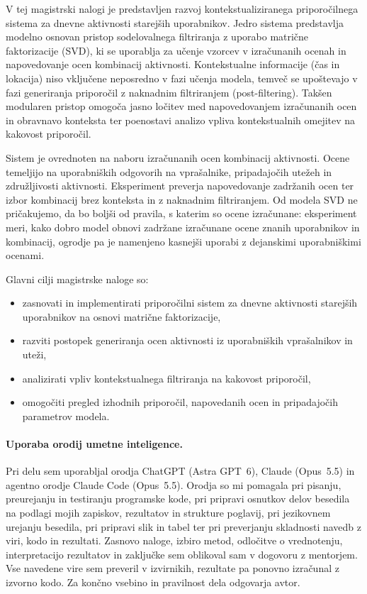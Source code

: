 \documentclass[a4paper,twoside,openright,12pt,slovene]{book}
\begin{document}
V tej magistrski nalogi je predstavljen razvoj kontekstualiziranega
priporočilnega sistema za dnevne aktivnosti starejših uporabnikov. Jedro
sistema predstavlja modelno osnovan pristop sodelovalnega filtriranja z
uporabo matrične faktorizacije (SVD), ki se uporablja za učenje vzorcev v izračunanih ocenah in napovedovanje ocen kombinacij aktivnosti. Kontekstualne informacije
(čas in lokacija) niso vključene neposredno v fazi učenja modela, temveč se
upoštevajo v fazi generiranja priporočil z naknadnim filtriranjem
(post-filtering). Takšen modularen pristop omogoča jasno ločitev med
napovedovanjem izračunanih ocen in obravnavo konteksta ter poenostavi analizo vpliva
kontekstualnih omejitev na kakovost priporočil.

Sistem je ovrednoten na naboru izračunanih ocen kombinacij
aktivnosti. Ocene temeljijo na uporabniških odgovorih na
vprašalnike, pripadajočih utežeh in združljivosti aktivnosti.
Eksperiment preverja napovedovanje zadržanih ocen ter izbor
kombinacij brez konteksta in z naknadnim filtriranjem.
Od modela SVD ne pričakujemo, da bo boljši od pravila, s katerim so
ocene izračunane: eksperiment meri, kako dobro model obnovi zadržane
izračunane ocene znanih uporabnikov in kombinacij, ogrodje pa je
namenjeno kasnejši uporabi z dejanskimi uporabniškimi ocenami.

Glavni cilji magistrske naloge so:
\begin{itemize}
    \item zasnovati in implementirati priporočilni sistem za dnevne aktivnosti
    starejših uporabnikov na osnovi matrične faktorizacije,
    \item razviti postopek generiranja ocen aktivnosti iz uporabniških
    vprašalnikov in uteži,
    \item analizirati vpliv kontekstualnega filtriranja na kakovost
    priporočil,
    \item omogočiti pregled izhodnih priporočil, napovedanih ocen
in pripadajočih parametrov modela.
\end{itemize}

\paragraph{Uporaba orodij umetne inteligence.}
Pri delu sem uporabljal orodja ChatGPT (Astra GPT~6), Claude
(Opus~5.5) in agentno orodje Claude Code (Opus~5.5). Orodja so
mi pomagala pri pisanju, preurejanju in testiranju programske
kode, pri pripravi osnutkov delov besedila na podlagi mojih
zapiskov, rezultatov in strukture poglavij, pri jezikovnem
urejanju besedila, pri pripravi slik in tabel ter pri
preverjanju skladnosti navedb z viri, kodo in rezultati.
Zasnovo naloge, izbiro metod, odločitve o vrednotenju,
interpretacijo rezultatov in zaključke sem oblikoval sam
v dogovoru z mentorjem. Vse navedene vire sem preveril
v izvirnikih, rezultate pa ponovno izračunal z izvorno kodo.
Za končno vsebino in pravilnost dela odgovarja avtor.
\end{document}
